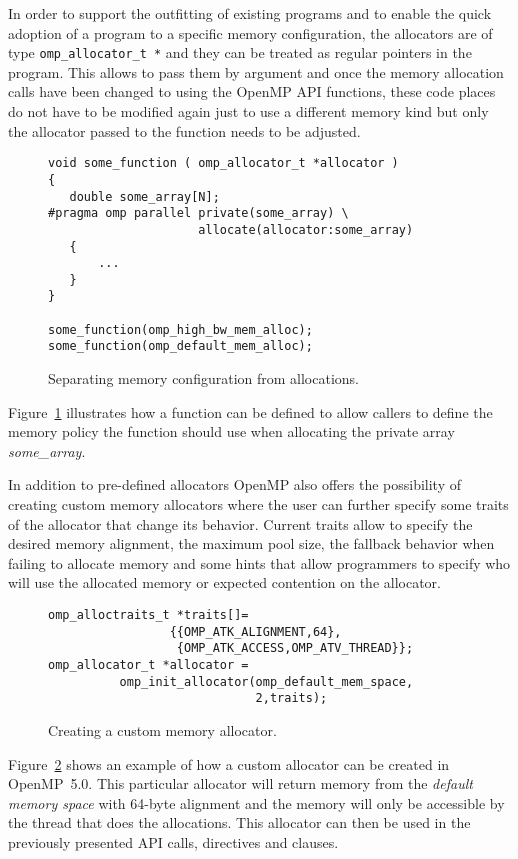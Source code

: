 In order to support the outfitting of existing programs and to enable the quick adoption of a program to a specific memory configuration, the allocators are of type \texttt{omp\_allocator\_t *} and they can be treated as regular pointers in the program.
This allows to pass them by argument and once the memory allocation calls have been changed to using the OpenMP API functions, these code places do not have to be modified again just to use a different memory kind but only the allocator passed to the function needs to be adjusted.

\begin{figure}[htb]
\begin{verbatim}
void some_function ( omp_allocator_t *allocator )
{
   double some_array[N];
#pragma omp parallel private(some_array) \
                     allocate(allocator:some_array)
   {
       ...
   }
}

some_function(omp_high_bw_mem_alloc);
some_function(omp_default_mem_alloc);
\end{verbatim}
\caption{Separating memory configuration from allocations.\label{fig:separation-concerns-alloc}}
\end{figure}

Figure~\ref{fig:separation-concerns-alloc} illustrates how a function can be defined to allow callers to define the memory policy the function should use when allocating the private array \emph{some\_array}.

In addition to pre-defined allocators OpenMP also offers the possibility of creating custom memory allocators where the user can further specify some traits of the allocator that change its behavior. Current traits allow to specify the desired memory alignment, the maximum pool size, the fallback behavior when failing to allocate memory and some hints that allow programmers to specify who will use the allocated memory or expected contention on the allocator.

\begin{figure}[hbt]
\begin{verbatim}
omp_alloctraits_t *traits[]=
                 {{OMP_ATK_ALIGNMENT,64},
                  {OMP_ATK_ACCESS,OMP_ATV_THREAD}};
omp_allocator_t *allocator = 
          omp_init_allocator(omp_default_mem_space,
                             2,traits);
\end{verbatim}
\caption{Creating a custom memory allocator.\label{fig:custom-allocator}}
\end{figure}

Figure~\ref{fig:custom-allocator} shows an example of how a custom allocator can be created in OpenMP~5.0. This particular allocator will return memory from the \emph{default memory space} with 64-byte alignment and the memory will only be accessible by the thread that does the allocations. This allocator can then be used in the previously presented API calls, directives and clauses.

